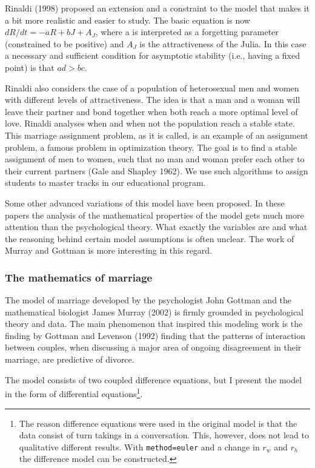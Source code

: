 \documentclass[
  a4paper,
  DIV=11,
  numbers=noendperiod,
  oneside]{scrreprt}
\begin{document}
Rinaldi (1998) proposed an extension and a constraint to the model that
makes it a bit more realistic and easier to study. The basic equation is
now \(dR/dt = - aR + bJ + A_{J}\), where a is interpreted as a
forgetting parameter (constrained to be positive) and \(A_{J}\) is the
attractiveness of the Julia. In this case a necessary and sufficient
condition for asymptotic stability (i.e., having a fixed point) is that
\(ad > bc\).

Rinaldi also considers the case of a population of heterosexual men and
women with different levels of attractiveness. The idea is that a man
and a woman will leave their partner and bond together when both reach a
more optimal level of love. Rinaldi analyses when and when not the
population reach a stable state. This marriage assignment problem, as it
is called, is an example of an assignment problem, a famous problem in
optimization theory. The goal is to find a stable assignment of men to
women, such that no man and woman prefer each other to their current
partners (Gale and Shapley 1962). We use such algorithms to assign
students to master tracks in our educational program.

Some other advanced variations of this model have been proposed. In
these papers the analysis of the mathematical properties of the model
gets much more attention than the psychological theory. What exactly the
variables are and what the reasoning behind certain model assumptions is
often unclear. The work of Murray and Gottman is more interesting in
this regard.

\hypertarget{sec-The-mathematics-of-marriage}{%
\subsubsection{The mathematics of
marriage}\label{sec-The-mathematics-of-marriage}}

The model of marriage developed by the psychologist John Gottman and the
mathematical biologist James Murray (2002) is firmly grounded in
psychological theory and data. The main phenomenon that inspired this
modeling work is the finding by Gottman and Levenson (1992) finding that
the patterns of interaction between couples, when discussing a major
area of ongoing disagreement in their marriage, are predictive of
divorce.

The model consists of two coupled difference equations, but I present
the model in the form of differential equations\footnote{The reason
  difference equations were used in the original model is that the data
  consist of turn takings in a conversation. This, however, does not
  lead to qualitative different results. With
  \texttt{method=\textquotesingle{}euler\textquotesingle{}} and a change
  in \(r_{w}\) and \(r_{h}\) the difference model can be constructed.}.
\end{document}
